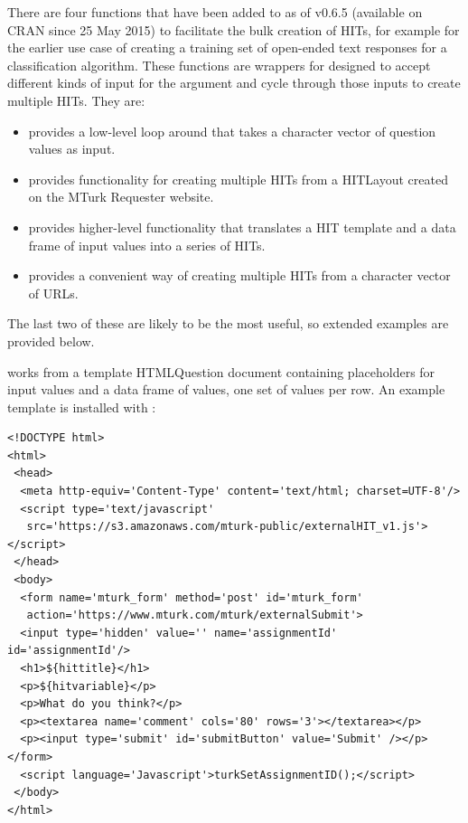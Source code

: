 There are four functions that have been added to  as of v0.6.5 (available on CRAN since 25 May 2015) to facilitate the bulk creation of HITs, for example for the earlier use case of creating a training set of open-ended text responses for a classification algorithm. These functions are wrappers for  designed to accept different kinds of input for the  argument and cycle through those inputs to create multiple HITs. They are: 

\begin{itemize}
\item {} provides a low-level loop around
   that takes a character vector of question values
  as input.
\item {} provides functionality for
  creating multiple HITs from a HITLayout created on the MTurk
  Requester website.
\item {} provides higher-level
  functionality that translates a HIT template and a data frame of
  input values into a series of HITs.
\item {} provides a convenient way of
  creating multiple HITs from a character vector of URLs.
\end{itemize}

\noindent The last two of these are likely to be the most useful, so extended examples are
provided below.

 works from a template HTMLQuestion
document containing placeholders for input values and a data frame of
values, one set of values per row. An example template is installed
with :

\begin{verbatim}
<!DOCTYPE html>
<html>
 <head>
  <meta http-equiv='Content-Type' content='text/html; charset=UTF-8'/>
  <script type='text/javascript' 
   src='https://s3.amazonaws.com/mturk-public/externalHIT_v1.js'></script>
 </head>
 <body>
  <form name='mturk_form' method='post' id='mturk_form' 
   action='https://www.mturk.com/mturk/externalSubmit'>
  <input type='hidden' value='' name='assignmentId' id='assignmentId'/>
  <h1>${hittitle}</h1>
  <p>${hitvariable}</p>
  <p>What do you think?</p>
  <p><textarea name='comment' cols='80' rows='3'></textarea></p>
  <p><input type='submit' id='submitButton' value='Submit' /></p></form>
  <script language='Javascript'>turkSetAssignmentID();</script>
 </body>
</html>
\end{verbatim}

